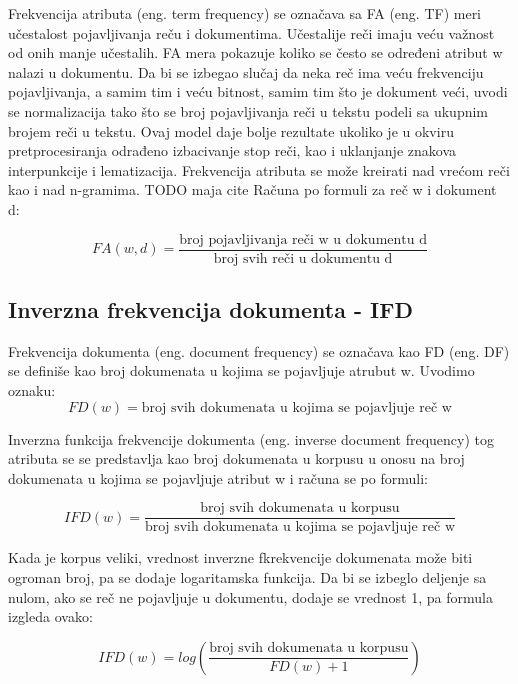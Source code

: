 \documentclass[12pt,oneside]{memoir}
\begin{document}
Frekvencija atributa (eng. term frequency) se označava sa FA (eng. TF) meri učestalost pojavljivanja reču i dokumentima.  Učestalije reči imaju veću važnost od onih manje učestalih.  FA mera pokazuje koliko se često se određeni atribut w nalazi u dokumentu. 
 Da bi se izbegao slučaj da neka reč ima veću frekvenciju pojavljivanja, a samim tim i veću bitnost, samim tim što je dokument veći, uvodi se normalizacija tako što se broj pojavljivanja reči u tekstu podeli sa ukupnim brojem reči u tekstu.  Ovaj model daje bolje rezultate ukoliko je u okviru pretprocesiranja odrađeno izbacivanje stop reči, kao i uklanjanje znakova interpunkcije i lematizacija.  Frekvencija atributa se može kreirati nad vrećom reči kao i nad n-gramima.  TODO maja cite
Računa po formuli za reč w i dokument d:

\begin{equation}
	FA(w,d) = \frac{\text{broj pojavljivanja reči w u dokumentu d}}{\text{broj svih reči u dokumentu d}}
\end{equation}

\subsection{Inverzna frekvencija dokumenta - IFD}

Frekvencija dokumenta (eng.  document frequency) se označava kao FD (eng.  DF) se definiše kao broj dokumenata u kojima se pojavljuje atrubut w.  Uvodimo oznaku:
\begin{equation}
	FD(w) = \text{broj svih dokumenata u kojima se pojavljuje reč w}
\end{equation}

Inverzna funkcija frekvencije dokumenta (eng.  inverse document frequency) tog atributa se se predstavlja kao broj dokumenata u korpusu u onosu na broj dokumenata u kojima se pojavljuje atribut w i računa se po formuli:

\begin{equation}
	IFD(w) = \frac{\text{broj svih dokumenata u korpusu}}{\text{broj svih dokumenata u kojima se pojavljuje reč w}}
\end{equation}

Kada je korpus veliki,  vrednost inverzne fkrekvencije dokumenata može biti ogroman broj, pa se dodaje logaritamska funkcija.  Da bi se izbeglo deljenje sa nulom, ako se reč ne pojavljuje u dokumentu,  dodaje se vrednost 1, pa formula izgleda ovako:

\begin{equation}
	IFD(w) = log\left(\frac{\text{broj svih dokumenata u korpusu}}{FD(w) + 1}\right)
\end{equation}
\end{document}
